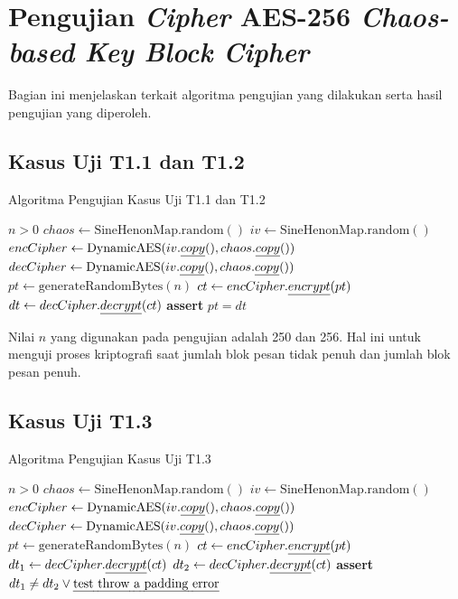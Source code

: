 \chapter{{{Pengujian \emph{Cipher} AES-256 \emph{Chaos-based Key Block Cipher}}}} 
\label{appendix:unit.test.cipher}

Bagian ini menjelaskan terkait algoritma pengujian yang dilakukan serta hasil pengujian yang diperoleh.

\section{Kasus Uji T1.1 dan T1.2}

\begin{algorithm}
  \caption{Algoritma Pengujian Kasus Uji T1.1 dan T1.2}
  \label{alg:unit.test.t1.1}
  \begin{algorithmic}
    \Require $n > 0$
    \State $chaos \gets \text{SineHenonMap.random}()$ 
    \State $iv \gets \text{SineHenonMap.random}()$
    \State $encCipher \gets \text{DynamicAES}(iv.\emph{copy}(), chaos.\emph{copy}())$
    \State $decCipher \gets \text{DynamicAES}(iv.\emph{copy}(), chaos.\emph{copy}())$
    \State
    \State $pt \gets \text{generateRandomBytes}(n)$ 
    \State $ct \gets encCipher.\emph{encrypt}(pt)$
    \State $dt \gets decCipher.\emph{decrypt}(ct)$
    \State
    \State \textbf{assert} $pt = dt$
  \end{algorithmic}
\end{algorithm}

Nilai $n$ yang digunakan pada pengujian adalah 250 dan 256. Hal ini untuk menguji proses kriptografi saat jumlah blok pesan tidak penuh dan jumlah blok pesan penuh. 

\section{Kasus Uji T1.3}

\begin{algorithm}
  \caption{Algoritma Pengujian Kasus Uji T1.3}
  \label{alg:unit.test.t1.3}
  \begin{algorithmic}
    \Require $n > 0$
    \State $chaos \gets \text{SineHenonMap.random}()$ 
    \State $iv \gets \text{SineHenonMap.random}()$
    \State $encCipher \gets \text{DynamicAES}(iv.\emph{copy}(), chaos.\emph{copy}())$
    \State $decCipher \gets \text{DynamicAES}(iv.\emph{copy}(), chaos.\emph{copy}())$
    \State
    \State $pt \gets \text{generateRandomBytes}(n)$ 
    \State $ct \gets encCipher.\emph{encrypt}(pt)$
    \State $dt_1 \gets decCipher.\emph{decrypt}(ct)$
    \State $dt_2 \gets decCipher.\emph{decrypt}(ct)$
    \State
    \State \textbf{assert} $dt_1 \ne dt_2 \lor \text{\emph{test throw a padding error}}$
  \end{algorithmic}
\end{algorithm}

